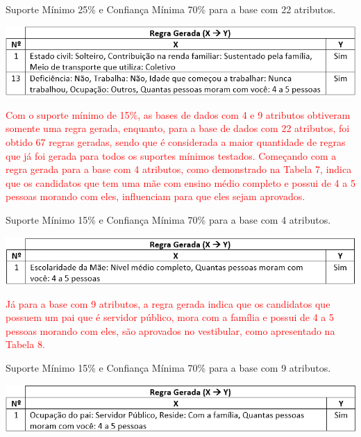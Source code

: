 \par
\begin{table}[!htp]
	\begin{center}
    \caption{\label{fig:waveform_fig} Suporte Mínimo 25\% e Confiança Mínima 70\% para a base com 22 atributos.}
	\includegraphics[scale=0.75]{Figuras/Suporte_25_atributos_22.png}
	\end{center}
\end{table}

\par
\textcolor{red}{Com o suporte mínimo de 15\%, as bases de dados com 4 e 9 atributos obtiveram somente uma regra gerada, enquanto, para a base de dados com 22 atributos, foi obtido 67 regras geradas, sendo que é considerada a maior quantidade de regras que já foi gerada para todos os suportes mínimos testados. Começando com a regra gerada para a base com 4 atributos, como demonstrado na Tabela 7, indica que os candidatos que tem uma mãe com ensino médio completo e possui de 4 a 5 pessoas morando com eles, influenciam para que eles sejam aprovados.}

\par
\begin{table}[!htp]
	\begin{center}
    \caption{\label{fig:waveform_fig} Suporte Mínimo 15\% e Confiança Mínima 70\% para a base com 4 atributos.}
	\includegraphics[scale=0.75]{Figuras/Suporte_15_atributos_4.png}
	\end{center}
\end{table}

\par
\textcolor{red}{Já para a base com 9 atributos, a regra gerada indica que os candidatos que possuem um pai que é servidor público, mora com a família e possui de 4 a 5 pessoas morando com eles, são aprovados no vestibular, como apresentado na Tabela 8.}

\par
\begin{table}[!htp]
	\begin{center}
    \caption{\label{fig:waveform_fig} Suporte Mínimo 15\% e Confiança Mínima 70\% para a base com 9 atributos.}
	\includegraphics[scale=0.75]{Figuras/Suporte_15_atributos_9.png}
	\end{center}
\end{table}

